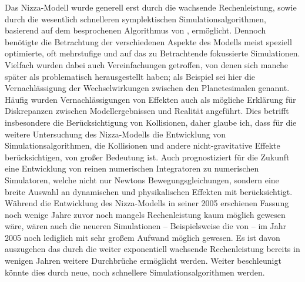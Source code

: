 \documentclass[12pt,a4paper,twoside,open=right,bibliography=totoc]{scrbook}
\renewcommand{\cite}{ \citep}
\begin{document}
Das Nizza-Modell wurde generell erst durch die wachsende Rechenleistung, sowie durch die wesentlich schnelleren symplektischen Simulationsalgorithmen, basierend auf dem besprochenen Algorithmus von \cite{Wisdom1991}, ermöglicht. Dennoch benötigte die Betrachtung der verschiedenen Aspekte des Modells meist speziell optimierte, oft mehrstufige und auf das zu Betrachtende fokussierte Simulationen.
Vielfach wurden dabei auch Vereinfachungen getroffen, von denen sich manche später als problematisch herausgestellt haben; als Beispiel sei hier die Vernachlässigung der Wechselwirkungen zwischen den Planetesimalen genannt. Häufig wurden Vernachlässigungen von Effekten auch als mögliche Erklärung für Diskrepanzen zwischen Modellergebnissen und Realität angeführt.
Dies betrifft insbesondere die Berücksichtigung von Kollisionen, daher glaube ich, dass für die weitere Untersuchung des Nizza-Modells die Entwicklung von Simulationsalgorithmen, die Kollisionen und andere nicht-gravitative Effekte berücksichtigen, von großer Bedeutung ist.
Auch \cite{Morbidelli2002} prognostiziert für die Zukunft eine Entwicklung von reinen numerischen Integratoren zu numerischen Simulatoren, welche nicht nur Newtons Bewegungsgleichungen, sondern eine breite Auswahl an dynamischen und physikalischen Effekten mit berücksichtigt.
Während die Entwicklung des Nizza-Modells in seiner 2005 erschienen Fassung noch wenige Jahre zuvor noch mangels Rechenleistung kaum möglich gewesen wäre, wären auch die neueren Simulationen -- Beispielsweise die von \cite{Nesvorny2012} -- im Jahr 2005 noch lediglich mit sehr großem Aufwand möglich gewesen.
Es ist davon auszugehen das durch die weiter exponentiell wachsende Rechenleistung bereits in wenigen Jahren weitere Durchbrüche ermöglicht werden.
Weiter beschleunigt könnte dies durch neue, noch schnellere Simulationsalgorithmen werden.
\end{document}
